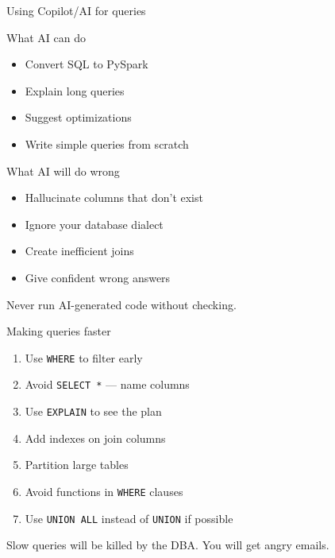 \documentclass[aspectratio=169, 11pt]{beamer}
\begin{document}
	\begin{frame}{Using Copilot/AI for queries}
		\tiny
		\begin{block}{What AI can do}
			\begin{itemize}
				\item Convert SQL to PySpark
				\item Explain long queries
				\item Suggest optimizations
				\item Write simple queries from scratch
			\end{itemize}
		\end{block}
		\begin{block}{What AI will do wrong}
			\tiny
			\begin{itemize}
				\item Hallucinate columns that don't exist
				\item Ignore your database dialect
				\item Create inefficient joins
				\item Give confident wrong answers
			\end{itemize}
		\end{block}
		\tiny\alert{Never run AI-generated code without checking.}
	\end{frame}
	
	\begin{frame}{Making queries faster}
		\tiny
		\begin{enumerate}
			\item Use \texttt{WHERE} to filter early
			\item Avoid \texttt{SELECT *} — name columns
			\item Use \texttt{EXPLAIN} to see the plan
			\item Add indexes on join columns
			\item Partition large tables
			\item Avoid functions in \texttt{WHERE} clauses
			\item Use \texttt{UNION ALL} instead of \texttt{UNION} if possible
		\end{enumerate}
		\vspace{0.05cm}
		\tiny\alert{Slow queries will be killed by the DBA. You will get angry emails.}
	\end{frame}
	
\end{document}

